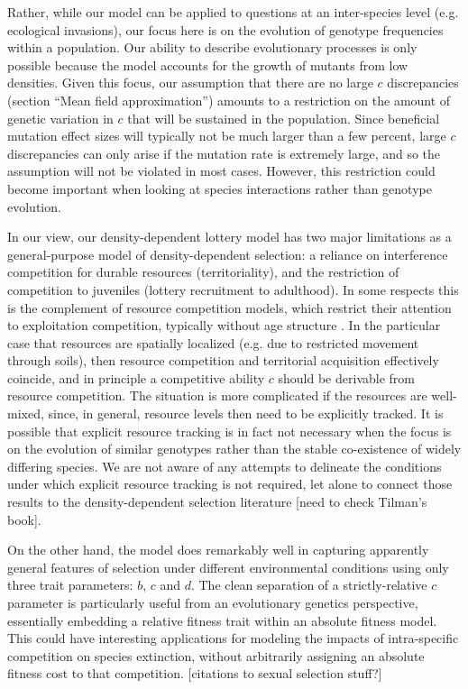 \documentclass[11pt]{article}
\begin{document}
Rather, while our model can be applied to questions at an inter-species level (e.g. ecological invasions), our focus here is on the evolution of genotype frequencies within a population. Our ability to describe evolutionary processes is only possible because the model accounts for the growth of mutants from low densities. Given this focus, our assumption that there are no large $c$ discrepancies (section ``Mean field approximation'') amounts to a restriction on the amount of genetic variation in $c$ that will be sustained in the population. Since beneficial mutation effect sizes will typically not be much larger than a few percent, large $c$ discrepancies can only arise if the mutation rate is extremely large, and so the assumption will not be violated in most cases. However, this restriction could become important when looking at species interactions rather than genotype evolution.

In our view, our density-dependent lottery model has two major limitations as a general-purpose model of density-dependent selection: a reliance on interference competition for durable resources (territoriality), and the restriction of competition to juveniles (lottery recruitment to adulthood). In some respects this is the complement of resource competition models, which restrict their attention to exploitation competition, typically without age structure \citep{tilman_1982}. In the particular case that resources are spatially localized (e.g. due to restricted movement through soils), then resource competition and territorial acquisition effectively coincide, and in principle a competitive ability $c$ should be derivable from resource competition. The situation is more complicated if the resources are well-mixed, since, in general, resource levels then need to be explicitly tracked. It is possible that explicit resource tracking is in fact not necessary when the focus is on the evolution of similar genotypes rather than the stable co-existence of widely differing species. We are not aware of any attempts to delineate the conditions under which explicit resource tracking is not required, let alone to connect those results to the density-dependent selection literature [need to check Tilman's book]. 

On the other hand, the model does remarkably well in capturing apparently general features of selection under different environmental conditions using only three trait parameters: $b$, $c$ and $d$. The clean separation of a strictly-relative $c$ parameter is particularly useful from an evolutionary genetics perspective, essentially embedding a relative fitness trait within an absolute fitness model. This could have interesting applications for modeling the impacts of intra-specific competition on species extinction, without arbitrarily assigning an absolute fitness cost to that competition. [citations to sexual selection stuff?]
\end{document}
